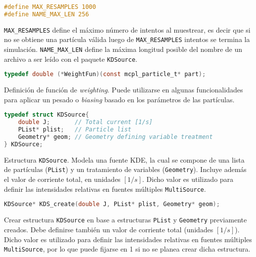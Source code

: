 \begin{footnotesize}

\begin{lstlisting}[language=C]
#define MAX_RESAMPLES 1000
#define NAME_MAX_LEN 256
\end{lstlisting}
\begin{addmargin}[0.5cm]{0cm}
\verb|MAX_RESAMPLES| define el máximo número de intentos al muestrear, es decir que si no se obtiene una partícula válida luego de \verb|MAX_RESAMPLES| intentos se termina la simulación. \verb|NAME_MAX_LEN| define la máxima longitud posible del nombre de un archivo a ser leído con el paquete \verb|KDSource|. 
\end{addmargin}

\begin{lstlisting}[language=C]
typedef double (*WeightFun)(const mcpl_particle_t* part);
\end{lstlisting}
\begin{addmargin}[0.5cm]{0cm}
Definición de función de \emph{weighting}. Puede utilizarse en algunas funcionalidades para aplicar un pesado o \emph{biasing} basado en los parámetros de las partículas.
\end{addmargin}

\begin{lstlisting}[language=C]
typedef struct KDSource{
	double J;       // Total current [1/s]
	PList* plist;   // Particle list
	Geometry* geom; // Geometry defining variable treatment
} KDSource;
\end{lstlisting}
\begin{addmargin}[0.5cm]{0cm}
Estructura \verb|KDSource|. Modela una fuente KDE, la cual se compone de una lista de partículas (\verb|PList|) y un tratamiento de variables (\verb|Geometry|). Incluye además el valor de corriente total, en unidades $[1/s]$. Dicho valor es utilizado para definir las intensidades relativas en fuentes múltiples \verb|MultiSource|.
\end{addmargin}

\begin{lstlisting}[language=C]
KDSource* KDS_create(double J, PList* plist, Geometry* geom);
\end{lstlisting}
\begin{addmargin}[0.5cm]{0cm}
Crear estructura \verb|KDSource| en base a estructuras \verb|PList| y \verb|Geometry| previamente creados. Debe definirse también un valor de corriente total (unidades $[1/s]$). Dicho valor es utilizado para definir las intensidades relativas en fuentes múltiples \verb|MultiSource|, por lo que puede fijarse en 1 si no se planea crear dicha estructura.
\end{addmargin}


\end{footnotesize}
